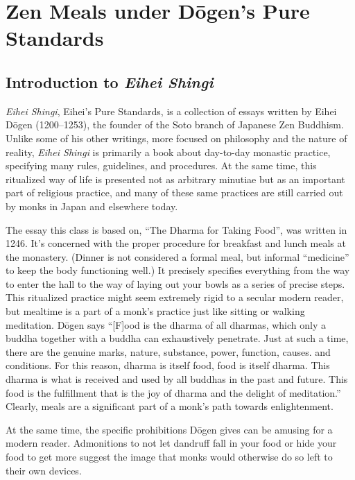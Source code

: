 \documentclass{article}
\begin{document}
\chapter{Zen Meals under Dōgen's Pure Standards}

\raggedcolumns
\begin{multicols}{2}

\section{Introduction to \emph{Eihei Shingi}}

\emph{Eihei Shingi}, Eihei's Pure Standards, is a collection of essays
written by Eihei D\=ogen (1200--1253), the founder of the Soto branch
of Japanese Zen Buddhism. Unlike some of his other writings, more
focused on philosophy and the nature of reality, \emph{Eihei Shingi}
is primarily a book about day-to-day monastic practice, specifying
many rules, guidelines, and procedures. At the same time, this
ritualized way of life is presented not as arbitrary minutiae but as an
important part of religious practice, and many of these same practices
are still carried out by monks in Japan and elsewhere today.

The essay this class is based on, ``The Dharma for Taking Food'', was
written in 1246. It's concerned with the proper procedure for
breakfast and lunch meals at the monastery. (Dinner is not considered
a formal meal, but informal ``medicine'' to keep the body functioning
well.) It precisely specifies everything from the way to enter the
hall to the way of laying out your bowls as a series of precise
steps. This ritualized practice might seem extremely rigid to a
secular modern reader, but mealtime is a part of a monk's practice
just like sitting or walking meditation. D\=ogen says ``[F]ood is
the dharma of all dharmas, which only a buddha together with a buddha
can exhaustively penetrate. Just at such a time, there are the genuine
marks, nature, substance, power, function, causes. and conditions. For
this reason, dharma is itself food, food is itself dharma. This dharma
is what is received and used by all buddhas in the past and
future. This food is the fulfillment that is the joy of dharma and the
delight of meditation.'' Clearly, meals are a significant part of a
monk's path towards enlightenment.

At the same time, the specific prohibitions D\=ogen gives can be
amusing for a modern reader. Admonitions to not let dandruff fall in
your food or hide your food to get more suggest the image that monks
would otherwise do so left to their own devices.


\end{multicols}
\end{document}
